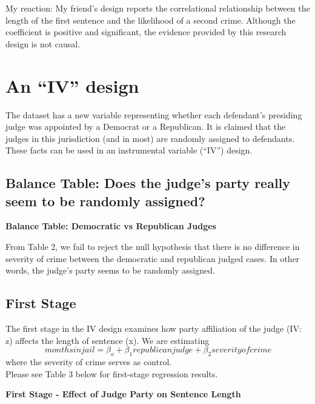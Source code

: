 \documentclass[12pt]{article}
\begin{document}
My reaction: My friend's design reports the correlational relationship between the length of the first sentence and the likelihood of a second crime. Although the coefficient is positive and significant, the evidence provided by this research design is not causal.

\section{An ``IV'' design}

The dataset has a new variable representing whether each defendant's presiding judge was appointed by a Democrat or a Republican. It is claimed that the judges in this jurisdiction (and in most) are randomly assigned to defendants. These facts can be used in an instrumental variable (``IV'') design. 

\subsection{Balance Table: Does the judge's party really seem to be randomly assigned?}

\begin{table}[H]
    \begin{center} 
    \caption{\textbf{Balance Table: Democratic vs Republican Judges}}
    \label{tab:balance}
    
    \end{center}
\end{table}

From Table 2, we fail to reject the null hypothesis that there is no difference in severity of crime between the democratic and republican judged cases. In other words, the judge's party seems to be randomly assigned.

\subsection{First Stage}

The first stage in the IV design examines how party affiliation of the judge (IV: z) affects the length of sentence (x). We are estimating
$$ monthsinjail = \beta_o + \beta_1 republicanjudge + \beta_2 severityofcrime $$ where the severity of crime serves as control. 
\\

Please see Table 3 below for first-stage regression results.

\begin{table}[H]
    \begin{center} 
     \caption{\textbf{First Stage - Effect of Judge Party on Sentence Length}}
    \label{tab:balance}
    
    \end{center}
\end{table}
\end{document}
